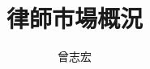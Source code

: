 \documentclass[12pt]{article}
\begin{document}
\begin{CJK}{UTF8}{bsmi}
\author{曾志宏}
\title{律師市場概況}


\end{CJK}
\end{document}

